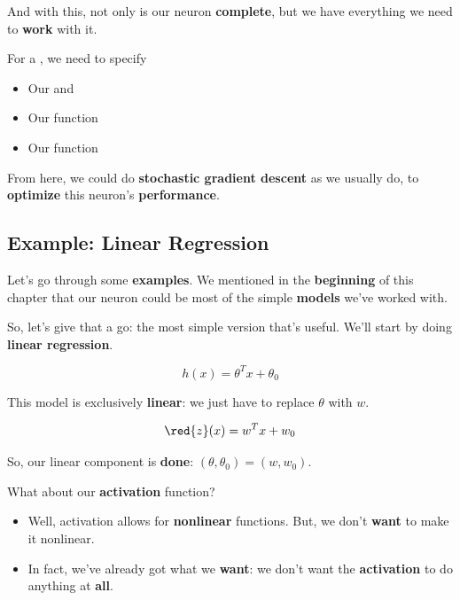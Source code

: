         And with this, not only is our neuron \textbf{complete}, but we have everything we need to \textbf{work} with it.\\
        
        \begin{concept}
            For a , we need to specify
        
            \begin{itemize}
                \item Our  and 
                \item Our  function
                \item Our  function
            \end{itemize}
        \end{concept}
        
        From here, we could do \textbf{stochastic gradient descent} as we usually do, to \textbf{optimize} this neuron's \textbf{performance}.
        
    \subsection{Example: Linear Regression}
    
        Let's go through some \textbf{examples}. We mentioned in the \textbf{beginning} of this chapter that our neuron could be most of the simple \textbf{models} we've worked with.
        
        So, let's give that a go: the most simple version that's useful. We'll start by doing \textbf{linear regression}.
        
        \begin{equation*}
            h(x) = \theta^T x + \theta_0
        \end{equation*}
        
        This model is exclusively \textbf{linear}: we just have to replace $\theta$ with $w$.
        
        \begin{equation*}
            \red{z}(x) = w^T x + w_0
        \end{equation*}
        
        So, our linear component is \textbf{done}: $(\theta, \theta_0) = (w, w_0)$.
        
        What about our \textbf{activation} function?

        \begin{itemize}
            \item Well, activation allows for \textbf{nonlinear} functions. But, we don't \textbf{want} to make it nonlinear. 
            
            \item In fact, we've already got what we \textbf{want}: we don't want the \textbf{activation} to do anything at \textbf{all}.
        \end{itemize}
        
